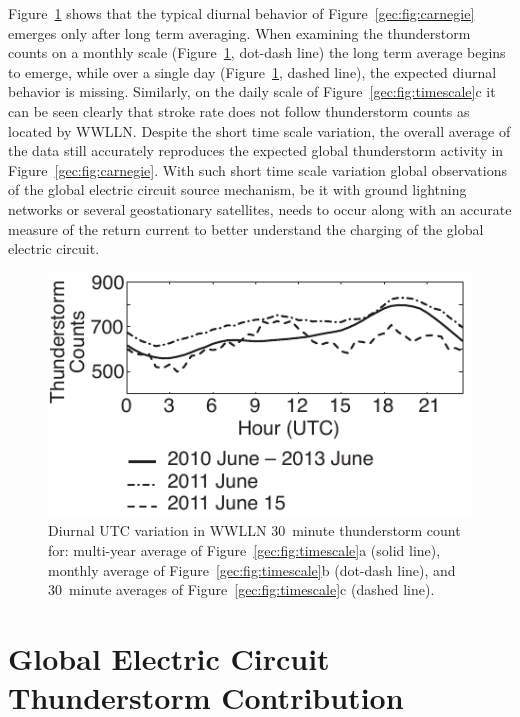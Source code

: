 Figure~\ref{gec:fig:averaging} shows that the typical diurnal behavior of Figure~\ref{gec:fig:carnegie} emerges only after long term averaging.
When examining the thunderstorm counts on a monthly scale (Figure~\ref{gec:fig:averaging}, dot-dash line) the long term average begins to emerge, while over a single day (Figure~\ref{gec:fig:averaging}, dashed line), the expected diurnal behavior is missing.
Similarly, on the daily scale of Figure~\ref{gec:fig:timescale}c it can be seen clearly that stroke rate does not follow thunderstorm counts as located by WWLLN.
Despite the short time scale variation, the overall average of the data still accurately reproduces the expected global thunderstorm activity in Figure~\ref{gec:fig:carnegie}.
With such short time scale variation global observations of the global electric circuit source mechanism, be it with ground lightning networks or several geostationary satellites, needs to occur along with an accurate measure of the return current to better understand the charging of the global electric circuit.

 \begin{figure}[ht!]
    \centering
    \includegraphics[scale=1]{GEC/Figures/averaging.pdf} 
    \caption{Diurnal UTC variation in WWLLN 30~minute thunderstorm count for:
    		multi-year average of Figure~\ref{gec:fig:timescale}a (solid line),
		monthly average of Figure~\ref{gec:fig:timescale}b (dot-dash line),
		and 30~minute averages of Figure~\ref{gec:fig:timescale}c (dashed line).}
    \label{gec:fig:averaging}
 \end{figure}

\section{Global Electric Circuit Thunderstorm Contribution}

